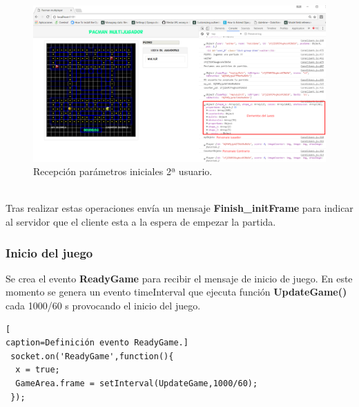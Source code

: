 \begin{figure}[!h]
\begin{center}
   \includegraphics[width=0.8\linewidth]{Figures/Player2_frameInit}
	\decoRule
	\caption[Recepción parámetros iniciales 2ª usuario.]{Recepción parámetros iniciales 2ª usuario.}
\label{fig:Player2_frameInit}
\end{center}
\end{figure}
\\Tras realizar estas operaciones envía un mensaje \textbf{Finish\_initFrame} para indicar al servidor que el cliente esta a la espera de empezar la partida.
\subsubsection*{Inicio del juego}
Se crea el evento \textbf{ReadyGame} para recibir el mensaje de inicio de juego. En este momento se genera un evento timeInterval que ejecuta función \textbf{UpdateGame()} cada 1000/60 s provocando el inicio del juego.
\begin{lstlisting}[
caption=Definición evento ReadyGame.]
 socket.on('ReadyGame',function(){
  x = true;
  GameArea.frame = setInterval(UpdateGame,1000/60);
 });
\end{lstlisting}
